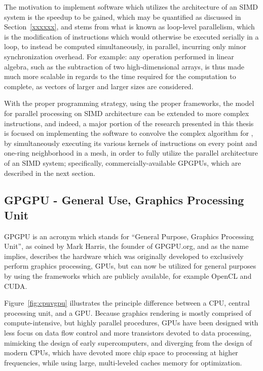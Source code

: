 The motivation to implement software which utilizes the architecture of an SIMD system is the speedup to be gained, which may be quantified as discussed in Section~\ref{xxxxxx}, and stems from what is known as loop-level parallelism, which is the modification of instructions which would otherwise be executed serially in a loop, to instead be computed simultaneously, in parallel, incurring only minor synchronization overhead. For example: any operation performed in linear algebra, such as the subtraction of two high-dimensional arrays, is thus made much more scalable in regards to the time required for the computation to complete, as vectors of larger and larger sizes are considered.

With the proper programming strategy, using the proper frameworks, the model for parallel processing on SIMD architecture can be extended to more complex instructions, and indeed, a major portion of the research presented in this thesis is focused on implementing the software to convolve the complex algorithm for , by simultaneously executing its various kernels of instructions on every point and one-ring neighborhood in a mesh, in order to fully utilize the parallel architecture of an SIMD system; specifically, commercially-available GPGPUs, which are described in the next section.

%
%
%
%
\subsection{GPGPU - General Use, Graphics Processing Unit}
GPGPU is an acronym which stands for ``General Purpose, Graphics Processing Unit'', as coined by Mark Harris, the founder of GPGPU.org, and as the name implies, describes the hardware which was originally developed to exclusively perform graphics processing, GPUs, but can now be utilized for general purposes by using the frameworks which are publicly available, for example OpenCL and CUDA.

Figure~\ref{fig:cpuvgpu} illustrates the principle difference between a CPU, central processing unit, and a GPU. Because graphics rendering is mostly comprised of compute-intensive, but highly parallel procedures, GPUs have been designed with less focus on data flow control and more transistors devoted to data processing, mimicking the design of early supercomputers, and diverging from the design of modern CPUs, which have devoted more chip space to processing at higher frequencies, while using large, multi-leveled caches memory for optimization.


